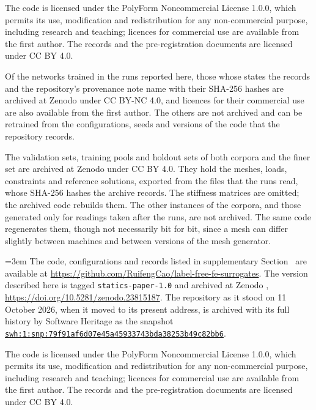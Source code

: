 The code is licensed under the PolyForm Noncommercial License 1.0.0, which permits its
use, modification and redistribution for any non-commercial purpose, including research
and teaching; licences for commercial use are available from the first author. The records
and the pre-registration documents are licensed under CC BY 4.0.

Of the networks trained in the runs reported here, those whose states the records and the
repository's provenance note name with their SHA-256 hashes are archived at Zenodo
\cite{Cao2026Networks} under CC BY-NC 4.0, and licences for their commercial use are also
available from the first author. The others are not archived and can be retrained from the
configurations, seeds and versions of the code that the repository records.

The validation sets, training pools and holdout sets of both corpora and the finer set are
archived at Zenodo \cite{Cao2026Data} under CC BY 4.0. They hold the meshes, loads,
constraints and reference solutions, exported from the files that the runs read, whose
SHA-256 hashes the archive records. The stiffness matrices are omitted; the archived code
rebuilds them. The other instances of the corpora, and those generated only for readings
taken after the runs, are not archived. The same code regenerates them, though not
necessarily bit for bit, since a mesh can differ slightly between machines and between
versions of the mesh generator.
\else
{\raggedright\emergencystretch=3em The code, configurations and records listed in
supplementary Section~\SuppRepro{} are available at
\url{https://github.com/RuifengCao/label-free-fe-surrogates}. The version described here is
tagged \texttt{statics-paper-1.0} and archived at Zenodo \cite{Cao2026Zenodo},
\url{https://doi.org/10.5281/zenodo.23815187}. The repository as it stood on 11 October 2026,
when it moved to its present address, is archived with its full history by Software Heritage
as the snapshot
\href{https://archive.softwareheritage.org/swh:1:snp:79f91af6d07e45a45933743bda38253b49c82bb6}{\nolinkurl{swh:1:snp:79f91af6d07e45a45933743bda38253b49c82bb6}}.\par}

The code is licensed under the PolyForm Noncommercial License 1.0.0, which permits its
use, modification and redistribution for any non-commercial purpose, including research
and teaching; licences for commercial use are available from the first author. The records
and the pre-registration documents are licensed under CC BY 4.0.

